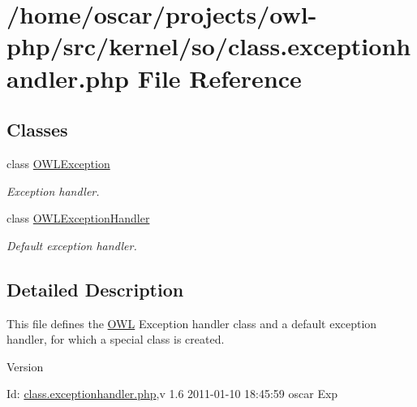\section{/home/oscar/projects/owl-\/php/src/kernel/so/class.exceptionhandler.php File Reference}
\label{class_8exceptionhandler_8php}
\subsection*{Classes}
\begin{DoxyCompactItemize}
\item 
class \hyperlink{classOWLException}{OWLException}
\begin{DoxyCompactList}\small\item\em Exception handler. \item\end{DoxyCompactList}\item 
class \hyperlink{classOWLExceptionHandler}{OWLExceptionHandler}
\begin{DoxyCompactList}\small\item\em Default exception handler. \item\end{DoxyCompactList}\end{DoxyCompactItemize}


\subsection{Detailed Description}
This file defines the \hyperlink{classOWL}{OWL} Exception handler class and a default exception handler, for which a special class is created. \begin{DoxyVersion}{Version}

\end{DoxyVersion}
\begin{DoxyParagraph}{Id:}
\hyperlink{class_8exceptionhandler_8php}{class.exceptionhandler.php},v 1.6 2011-\/01-\/10 18:45:59 oscar Exp 
\end{DoxyParagraph}
